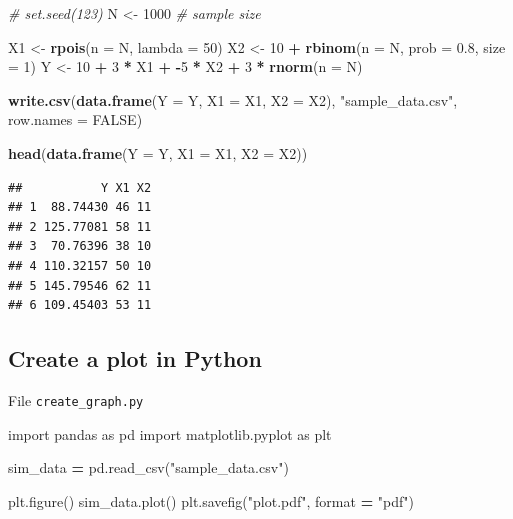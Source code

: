 \documentclass[]{book}
\newenvironment{Shaded}{\begin{snugshade}}{\end{snugshade}}
\newcommand{\KeywordTok}[1]{\textcolor[rgb]{0.13,0.29,0.53}{\textbf{#1}}}
\newcommand{\DataTypeTok}[1]{\textcolor[rgb]{0.13,0.29,0.53}{#1}}
\newcommand{\DecValTok}[1]{\textcolor[rgb]{0.00,0.00,0.81}{#1}}
\newcommand{\FloatTok}[1]{\textcolor[rgb]{0.00,0.00,0.81}{#1}}
\newcommand{\StringTok}[1]{\textcolor[rgb]{0.31,0.60,0.02}{#1}}
\newcommand{\ImportTok}[1]{#1}
\newcommand{\CommentTok}[1]{\textcolor[rgb]{0.56,0.35,0.01}{\textit{#1}}}
\newcommand{\OtherTok}[1]{\textcolor[rgb]{0.56,0.35,0.01}{#1}}
\newcommand{\OperatorTok}[1]{\textcolor[rgb]{0.81,0.36,0.00}{\textbf{#1}}}
\newcommand{\BuiltInTok}[1]{#1}
\newcommand{\NormalTok}[1]{#1}
\theoremstyle{definition}
\theoremstyle{definition}
\theoremstyle{definition}
\theoremstyle{remark}
\begin{document}
\begin{Shaded}
\begin{Highlighting}[]
\CommentTok{# set.seed(123)}
\NormalTok{N <-}\StringTok{ }\DecValTok{1000} \CommentTok{# sample size}

\NormalTok{X1 <-}\StringTok{ }\KeywordTok{rpois}\NormalTok{(}\DataTypeTok{n =}\NormalTok{ N, }\DataTypeTok{lambda =} \DecValTok{50}\NormalTok{)}
\NormalTok{X2 <-}\StringTok{ }\DecValTok{10} \OperatorTok{+}\StringTok{ }\KeywordTok{rbinom}\NormalTok{(}\DataTypeTok{n =}\NormalTok{ N, }\DataTypeTok{prob =} \FloatTok{0.8}\NormalTok{, }\DataTypeTok{size =} \DecValTok{1}\NormalTok{)}
\NormalTok{Y <-}\StringTok{ }\DecValTok{10} \OperatorTok{+}\StringTok{ }\DecValTok{3} \OperatorTok{*}\StringTok{ }\NormalTok{X1 }\OperatorTok{+}\StringTok{ }\OperatorTok{-}\DecValTok{5} \OperatorTok{*}\StringTok{ }\NormalTok{X2 }\OperatorTok{+}\StringTok{ }\DecValTok{3} \OperatorTok{*}\StringTok{ }\KeywordTok{rnorm}\NormalTok{(}\DataTypeTok{n =}\NormalTok{ N)}

\KeywordTok{write.csv}\NormalTok{(}\KeywordTok{data.frame}\NormalTok{(}\DataTypeTok{Y =}\NormalTok{ Y, }\DataTypeTok{X1 =}\NormalTok{ X1, }\DataTypeTok{X2 =}\NormalTok{ X2),}
          \StringTok{"sample_data.csv"}\NormalTok{, }\DataTypeTok{row.names =} \OtherTok{FALSE}\NormalTok{)}
\end{Highlighting}
\end{Shaded}

\begin{Shaded}
\begin{Highlighting}[]
\KeywordTok{head}\NormalTok{(}\KeywordTok{data.frame}\NormalTok{(}\DataTypeTok{Y =}\NormalTok{ Y, }\DataTypeTok{X1 =}\NormalTok{ X1, }\DataTypeTok{X2 =}\NormalTok{ X2))}
\end{Highlighting}
\end{Shaded}

\begin{verbatim}
##           Y X1 X2
## 1  88.74430 46 11
## 2 125.77081 58 11
## 3  70.76396 38 10
## 4 110.32157 50 10
## 5 145.79546 62 11
## 6 109.45403 53 11
\end{verbatim}

\subsection{Create a plot in Python}\label{create-a-plot-in-python}

File \texttt{create\_graph.py}

\begin{Shaded}
\begin{Highlighting}[]
\ImportTok{import}\NormalTok{ pandas }\ImportTok{as}\NormalTok{ pd}
\ImportTok{import}\NormalTok{ matplotlib.pyplot }\ImportTok{as}\NormalTok{ plt}

\NormalTok{sim_data }\OperatorTok{=}\NormalTok{ pd.read_csv(}\StringTok{"sample_data.csv"}\NormalTok{)}

\NormalTok{plt.figure()}
\NormalTok{sim_data.plot()}
\NormalTok{plt.savefig(}\StringTok{"plot.pdf"}\NormalTok{, }\BuiltInTok{format} \OperatorTok{=} \StringTok{"pdf"}\NormalTok{)}
\end{Highlighting}
\end{Shaded}
\end{document}
